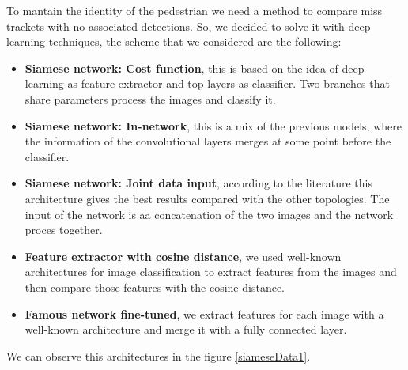 To mantain the identity of the pedestrian we need a method to compare miss trackets with no associated detections. So, we decided to solve it with deep learning techniques, the scheme that we considered are the following:


\begin{itemize}


\item \textbf{Siamese network: Cost function}, this is based on the idea of deep learning as feature extractor and top layers as classifier. Two branches that share parameters process the images and classify it.

\item \textbf{Siamese network: In-network}, this is a mix of the previous models, where the information of the convolutional layers merges at some point before the classifier.

\item \textbf{Siamese network: Joint data input}, according to the literature this architecture gives the best results compared with the other topologies. The input of the network is aa concatenation of the two images and the network proces together.


\item \textbf{Feature extractor with cosine distance}, we used well-known architectures for image classification to extract features from the images and then compare those features with the cosine distance.

\item \textbf{Famous network fine-tuned}, we extract features for each image with a well-known architecture and merge it with a fully connected layer.

\end{itemize}

We can observe this architectures in the figure \ref{siameseData1}.

